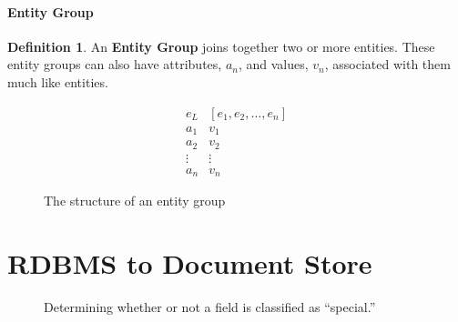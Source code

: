 \documentclass[12pt,letterpaper,oneside,notitlepage]{report}
\theoremstyle{definition}
\newtheorem{defn}{Definition}
\begin{document}
        \subsubsection{Entity Group}
          \begin{defn}
            An \textbf{Entity Group} joins together two or more entities.  These entity groups can also have attributes, $a_n$, and values, $v_n$, associated with them much like entities.

            \begin{figure}[!ht]
              \centering
              \[
                \begin{array}{ll}
                  e_L & \left[ e_1, e_2, \ldots, e_n \right] \\
                  a_1 & v_1 \\
                  a_2 & v_2 \\
                  \vdots & \vdots \\
                  a_n & v_n
                \end{array}
              \]
              \caption{The structure of an entity group}
              \label{fig:entity-group-rep}
            \end{figure}

%
%              
%
          \end{defn}

  \chapter{RDBMS to Document Store}
    \begin{figure}[ht!]
      \caption{Determining whether or not a field is classified as ``special.''}
      \label{src:molly-datatypes-entity-special}
    \end{figure}
    
\end{document}
